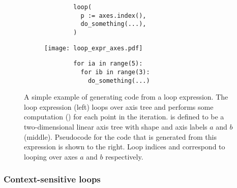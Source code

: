 \documentclass[thesis]{subfiles}
\begin{document}
\begin{figure}[h]
  \centering

  \hfill
  \begin{subfigure}[t]{.3\textwidth}
    \centering
    \begin{minipage}{.8\textwidth}
      \begin{verbatim}
        loop(
          p := axes.index(),
          do_something(...),
        )
      \end{verbatim}
    \end{minipage}
    \vspace{1em}
  \end{subfigure}
  \hfill
  \begin{subfigure}[t]{.38\textwidth}
    \centering
    \begin{minipage}{\textwidth}
      \centering
      \texttt{[image: loop\_expr\_axes.pdf]}
    \end{minipage}
  \end{subfigure}
  \hfill
  \begin{subfigure}[t]{.3\textwidth}
    \centering
    \begin{minipage}{.8\textwidth}
      \begin{verbatim}
        for ia in range(5):
          for ib in range(3):
            do_something(...)
      \end{verbatim}
    \end{minipage}
    \vspace{1.5em}
  \end{subfigure}
  \hfill

  \caption{
    A simple example of generating code from a loop expression.
    The loop expression (left) loops over axis tree  and performs some computation () for each point in the iteration.
     is defined to be a two-dimensional linear axis tree with shape  and axis labels $a$ and $b$ (middle).
    Pseudocode for the code that is generated from this expression is shown to the right.
    Loop indices  and  correspond to looping over axes $a$ and $b$ respectively.
  }
  \label{fig:loop_expr}
\end{figure}

\subsubsection{Context-sensitive loops}
\end{document}
